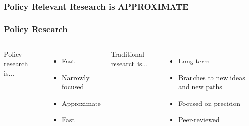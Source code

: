 \documentclass{beamer}
\begin{document}
{
\begin{frame}[plain]
\frametitle{Policy Relevant Research is APPROXIMATE}
\end{frame}
}


\begin{frame}
\frametitle{Policy Research}
  \begin{columns}
  Policy research is...
  \begin{itemize}
  \item Fast
  \item Narrowly focused
  \item Approximate
  \item Fast
  \pause
  \end{itemize}
  Traditional research is...
  \begin{itemize}
  \item Long term
  \pause
  \item Branches to new ideas and new paths
  \pause
  \item Focused on precision 
  \pause
  \item Peer-reviewed
  \end{itemize}
  \end{columns}
\end{frame}
\end{document}
